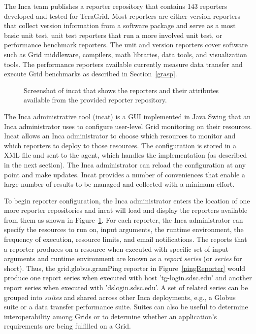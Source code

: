 \documentclass[times,10pt,twocolumn]{article}
\begin{document}
The Inca team publishes a reporter repository that contains 143 reporters
developed and tested for TeraGrid.  Most reporters are either version
reporters that collect version information from a software package and
serve as a most basic unit test, unit test reporters that run a more involved
unit test, or performance benchmark reporters.  The unit and version
reporters cover software such as Grid middleware, compilers, math libraries,
data tools, and visualization tools.  The performance reporters available
currently measure data transfer and execute Grid benchmarks as described in
Section~\ref{grasp}.


\begin{figure}[tbp]
  \centering
  \mbox{}
  \caption{\label{incat_fig} Screenshot of incat that shows the reporters
  and their attributes available from the provided reporter repository.}
\end{figure}

The Inca administrative tool (incat) is a GUI implemented in Java Swing that an
Inca administrator uses to configure user-level Grid monitoring on their
resources.  Incat allows an Inca administrator to choose which resources to
monitor and which reporters to deploy to those resources.  The configuration
is stored in a XML file and sent to the agent, which handles the implementation
(as described in the next section).  The Inca administrator can reload the
configuration at any point and make updates.  Incat provides a number of
conveniences that enable a large number of results to be managed and collected
with a minimum effort.  

To begin reporter configuration, the Inca administrator enters the location of
one more reporter repositories and incat will load and display the reporters
available from them as shown in Figure~\ref{incat_fig}.
For each reporter, the Inca administrator can specify the resources to run on,
input arguments, the runtime environment, the frequency of execution, resource
limits, and email notifications.  The reports that a reporter produces on a
resource when executed with specific set of input arguments and runtime
environment are known as a \emph{report series} (or \emph{series} for short).
Thus, the grid.globus.gramPing reporter in Figure~\ref{pingReporter} would
produce one report series when executed with host 'tg-login.sdsc.edu' and
another report series when executed with 'dslogin.sdsc.edu'.  A set of related
series can be grouped into \emph{suites} and shared across other Inca
deployments, e.g.,  a Globus suite or a data transfer
performance suite.  Suites can also be useful to determine interoperability
among Grids or to determine whether an application's requirements are being
fulfilled on a Grid.
\end{document}
